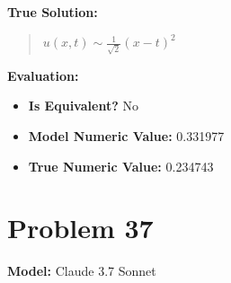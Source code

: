 \documentclass{article}
\begin{document}
\textbf{True Solution:}
\begin{quote}
$u(x,t) \sim \frac{1}{\sqrt{2}} (x-t)^2$
\end{quote}

\textbf{Evaluation:}
\begin{itemize}
\item \textbf{Is Equivalent?} No
\item \textbf{Model Numeric Value:} 0.331977
\item \textbf{True Numeric Value:} 0.234743
\end{itemize}
\vspace{1cm}
\section*{Problem 37}
\textbf{Model:} Claude 3.7 Sonnet
\end{document}

